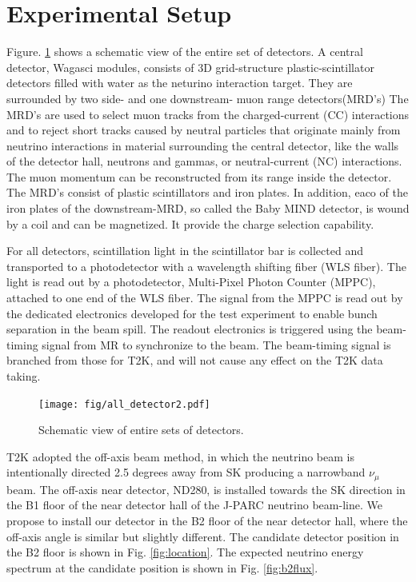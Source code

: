 \section{Experimental Setup}
Figure. \ref{fig:all_detector} shows a schematic view of the entire set of detectors.
A central detector, Wagasci modules, consists of 3D grid-structure plastic-scintillator detectors filled with water as the neturino interaction target.
They are surrounded by two side- and one downstream- muon range detectors(MRD's)
The MRD's are used to select muon tracks from the charged-current (CC) interactions 
and to reject short tracks caused by neutral particles 
that originate mainly from neutrino interactions in material surrounding the central detector, like the walls of the detector hall,
neutrons and gammas, or neutral-current (NC) interactions.
The muon momentum can be reconstructed from its range inside the detector.
The MRD's consist of plastic scintillators and iron plates.
In addition, eaco of the iron plates of the downstream-MRD, so called the Baby MIND detector, is wound by a coil and
can be magnetized. It provide the charge selection capability.

For all detectors, scintillation light in the scintillator bar is collected and transported to a photodetector with a wavelength shifting fiber (WLS fiber).
The light is read out by a photodetector, Multi-Pixel Photon Counter (MPPC), attached to one end of the WLS fiber.
The signal from the MPPC is read out by the dedicated electronics developed for the test experiment
to enable bunch separation in the beam spill.
The readout electronics is triggered using the beam-timing signal from MR to synchronize to the beam.
The beam-timing signal is branched from those for T2K, and will not cause any effect on the T2K data taking.

\begin{figure}[tbh]
\begin{center}
\texttt{[image: fig/all\_detector2.pdf]}
\end{center}
\caption{
Schematic view of entire sets of detectors.
}
\label{fig:all_detector}
\end{figure}

T2K adopted the off-axis beam method, in which
the neutrino beam is intentionally directed 2.5 degrees away from SK producing a narrowband $\nu_{\mu}$ beam.
The off-axis near detector, ND280, is installed towards the SK direction in the B1 floor of the near detector hall of the J-PARC neutrino beam-line.
We propose to install our detector in the B2 floor of the near detector hall, 
where the off-axis angle is similar but slightly different.
The candidate detector position in the B2 floor is shown in Fig. \ref{fig:location}.
The expected neutrino energy spectrum at the candidate position is shown in Fig. \ref{fig:b2flux}.

